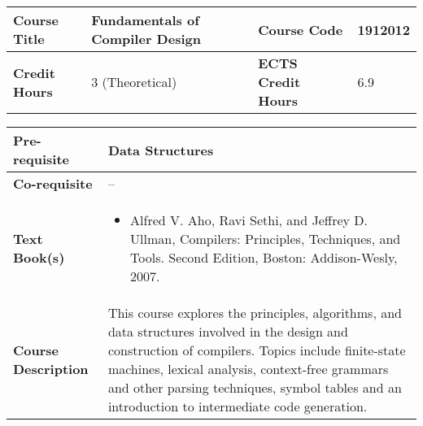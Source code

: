 \documentclass[12pt]{article}
\begin{document}
\begin{minipage}{\textwidth}
\begin{tabularx}{\textwidth}{|l|X|l|X|}
\hline
\textbf{Course Title}       &   Fundamentals of Compiler Design & \textbf{Course Code}       &  1912012 \\ \hline
\textbf{Credit Hours}       &  3 (Theoretical) & \textbf{ECTS Credit Hours}       &   6.9 \\ \hline
\end{tabularx}

\begin{tabularx}{\textwidth}{|l|X|}
\hline
\textbf{Pre-requisite}      &   Data Structures \\ \hline
\textbf{Co-requisite}       &  -- \\ \hline
\textbf{Text Book(s)}      & \begin{minipage}{.70\textwidth}
					\begin{itemize} \itemsep-0.4em
						\vspace{3mm}
						\item Alfred V. Aho, Ravi Sethi, and Jeffrey D. Ullman, Compilers: Principles, Techniques, and Tools. Second Edition, Boston: Addison-Wesly, 2007.
						\vspace{3mm}
					\end{itemize}
				\end{minipage}  \\ \hline
\textbf{Course Description} & \begin{minipage}{.70\textwidth}
					\vspace{3mm}
					This course explores the principles, algorithms, and data structures involved in the design and
					construction of compilers. Topics include finite-state machines, lexical analysis, context-free
					grammars and other parsing techniques, symbol tables and an introduction to intermediate code
					generation.

					\vspace{3mm}
					\end{minipage} \\ \hline
\end{tabularx}
\end{minipage}


\bigskip
\bigskip
\end{document}
